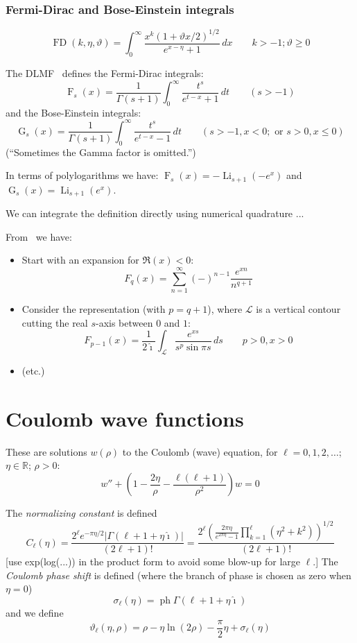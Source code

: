 \documentclass[10pt,dvipdfmx,letterpaper,twoside]{article}
\let\O=\operatorname
\newcommand{\RR}{{\mathbb{R}}}
\newcommand{\ii}{{\hat{\imath}}}
\newenvironment{implementation}{\noindent\begin{framed}}{\end{framed}}
\let\Gam=\Gamma
\let\sig=\sigma
\let\theta=\vartheta
\begin{document}
\subsubsection{Fermi-Dirac and Bose-Einstein integrals}
\[ \O{FD}(k,\eta,\theta) = \int_0^\infty \frac{x^k (1+\theta x/2)^{1/2}}{e^{x-\eta} + 1} \,dx \qquad k>-1; \theta\geq0\]

The DLMF~\cite{DLMF} defines the Fermi-Dirac integrals:
\[ \O{F}_s(x) = \frac{1}{\Gam(s+1)} \int_0^\infty \frac{t^s}{e^{t-x} + 1}\,dt \qquad(s>-1) \]
and the Bose-Einstein integrals:
\[ \O{G}_s(x) = \frac{1}{\Gam(s+1)} \int_0^\infty \frac{t^s}{e^{t-x} - 1}\,dt \qquad(s>-1, x<0; \text{\ or\ } s>0,x\leq0) \]
(``Sometimes the Gamma factor is omitted.'')

In terms of polylogarithms we have: $\O{F}_s(x) = -\O{Li}_{s+1}(-e^{x})$ and $\O{G}_s(x) = \O{Li}_{s+1}(e^{x})$.

\begin{implementation}
We can integrate the definition directly using numerical quadrature ...

From~\cite{approximation-fermi-dirac} we have:
\begin{itemize}
\item Start with an expansion for $\Re(x)<0$:
    \[ F_q(x) = \sum_{n=1}^\infty(-)^{n-1}\frac{e^{xn}}{n^{q+1}} \]
\item Consider the representation (with $p=q+1$), where $\mathcal{L}$ is a vertical contour cutting the real
    $s$-axis between $0$ and $1$:
    \[ F_{p-1}(x) = \frac{1}{2\ii} \int_{\mathcal{L}} \frac{e^{xs}}{s^p \sin\pi s}\,ds \qquad p>0, x>0 \]
\item (etc.)
\end{itemize}
\end{implementation}

\section{Coulomb wave functions}
These are solutions $w(\rho)$ to the Coulomb (wave) equation, for $\ell=0,1,2,\dots$; $\eta\in\RR$; $\rho>0$:
\[ w'' + \left( 1 - \frac{2\eta}{\rho} - \frac{\ell(\ell+1)}{\rho^2}\right) w = 0 \]

The {\em normalizing constant} is defined
\[ C_\ell(\eta) = \frac{2^\ell e^{-\pi\eta/2} |\Gam(\ell+1+\eta\ii)|}{(2\ell+1)!}
    = \frac{2^\ell \left( \frac{2\pi\eta}{e^{2\pi\eta} - 1} \prod_{k=1}^\ell(\eta^2 + k^2)\right)^{1/2}}{(2\ell+1)!} \]
[use exp(log(...)) in the product form to avoid some blow-up for large $\ell$.]
The {\em Coulomb phase shift} is defined (where the branch of phase is chosen as zero when $\eta=0$)
\[ \sig_\ell(\eta) = \O{ph} \Gam(\ell+1+\eta\ii) \]
and we define
\[ \theta_\ell(\eta,\rho) = \rho - \eta\ln(2\rho) - \frac\pi2\eta + \sig_\ell(\eta) \]
\end{document}
